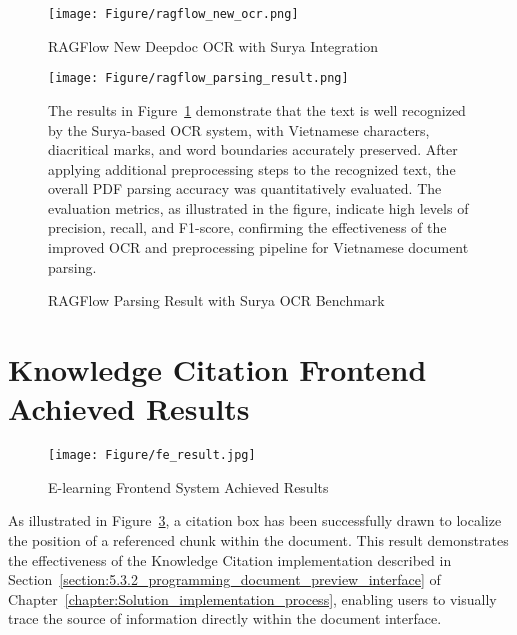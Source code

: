 \documentclass[../Main.tex]{subfiles}
\begin{document}
	\begin{figure}[h]
		\centering
		\texttt{[image: Figure/ragflow\_new\_ocr.png]}
		\caption{RAGFlow New Deepdoc OCR with Surya Integration}
		\label{fig:ragflow_new_ocr}
	\end{figure}

	\begin{figure}[h]
		\centering
		\begin{minipage}[t]{0.45\textwidth}
			\vspace{0pt} %
			\centering
			\texttt{[image: Figure/ragflow\_parsing\_result.png]}
			\caption{RAGFlow Parsing Result with Surya OCR Benchmark}
			\label{fig:ragflow_parsing_result}
		\end{minipage}%
		\hfill
		\begin{minipage}[t]{0.5\textwidth}
			\vspace{0pt} %
			\small The results in Figure~\ref{fig:ragflow_new_ocr} demonstrate that
			the text is well recognized by the Surya-based OCR system, with Vietnamese
			characters, diacritical marks, and word boundaries accurately preserved.
			After applying additional preprocessing steps to the recognized text, the overall
			PDF parsing accuracy was quantitatively evaluated. The evaluation metrics,
			as illustrated in the figure, indicate high levels of precision, recall,
			and F1-score, confirming the effectiveness of the improved OCR and preprocessing
			pipeline for Vietnamese document parsing.
		\end{minipage}
	\end{figure}

	\section{Knowledge Citation Frontend Achieved Results}
    \label{section:6.2_knowledge_citation_frontend_achieved_results}
	\begin{figure}[h]
		\centering
		\texttt{[image: Figure/fe\_result.jpg]}
		\caption{E-learning Frontend System Achieved Results}
		\label{fig:fe_result}
	\end{figure}

	As illustrated in Figure~\ref{fig:fe_result}, a citation box has been successfully
	drawn to localize the position of a referenced chunk within the document. This
	result demonstrates the effectiveness of the Knowledge Citation implementation
	described in Section~\ref{section:5.3.2_programming_document_preview_interface} of
	Chapter~\ref{chapter:Solution_implementation_process}, enabling users to visually
	trace the source of information directly within the document interface.
\end{document}
